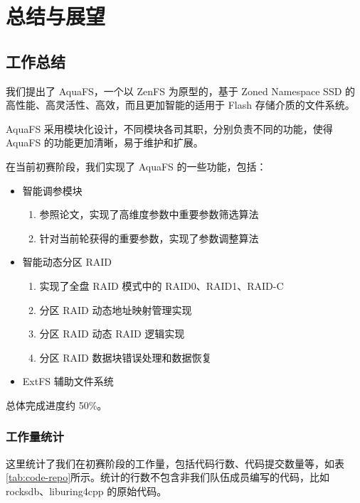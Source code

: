 \section{总结与展望}

\subsection{工作总结}

我们提出了 AquaFS，一个以 ZenFS 为原型的，基于 Zoned Namespace SSD 的高性能、高灵活性、高效，而且更加智能的适用于 Flash 存储介质的文件系统。

AquaFS 采用模块化设计，不同模块各司其职，分别负责不同的功能，使得 AquaFS 的功能更加清晰，易于维护和扩展。

在当前初赛阶段，我们实现了 AquaFS 的一些功能，包括：

\begin{itemize}
  \item 智能调参模块
  \begin{enumerate}
    \item 参照论文\cite{mahmud_confd_nodate}，实现了高维度参数中重要参数筛选算法
    \item 针对当前轮获得的重要参数，实现了参数调整算法
  \end{enumerate}
  \item 智能动态分区 RAID
  \begin{enumerate}
    \item 实现了全盘 RAID 模式中的 RAID0、RAID1、RAID-C
    \item 分区 RAID 动态地址映射管理实现
    \item 分区 RAID 动态 RAID 逻辑实现
    \item 分区 RAID 数据块错误处理和数据恢复
  \end{enumerate}
  \item ExtFS 辅助文件系统
\end{itemize}

总体完成进度约 50\%。

\subsubsection*{工作量统计}

这里统计了我们在初赛阶段的工作量，包括代码行数、代码提交数量等，如表\ref{tab:code-repo}所示。统计的行数不包含非我们队伍成员编写的代码，比如 rocksdb、liburing4cpp 的原始代码。

